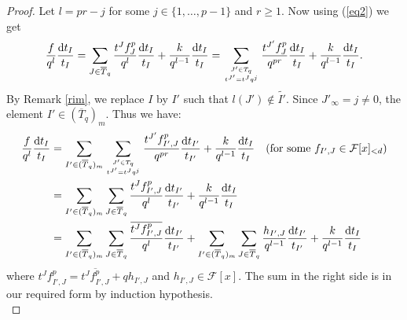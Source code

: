 \documentclass[times,10pt]{amsart}
\newcommand{\dd}{{\rm d}}
\newcommand{\F}{\ensuremath{\mathcal{F}}}
\begin{document}
\begin{proof}
  Let $ l= pr-j$ for some $j\in \{1,\ldots,p-1\}$ and $r\geq 1$.  Now using (\ref{eq2}) we get \begin{align*}
     \frac{f}{q^l}\frac{\dd t_I}{t_I} = \sum_{J\in \overline{T}_q} \frac{t^J f^p_J}{q^l}\frac{\dd t_I}{t_I}+ \frac{k}{q^{l-1}}\frac{\dd t_I}{t_I}= \sum_{J'\in {T}_q\atop t^{J'}=t^Jq^j} \frac{t^{J'} f^p_J}{q^{pr}}\frac{\dd t_I}{t_I}+ \frac{k}{q^{l-1}}\frac{\dd t_I}{t_I}.
 \end{align*}  By Remark \ref{rim},  we  replace $I$ by $I'$ such that $l(J')\notin \tilde{I'}$. Since $J'_{\infty}=j\neq 0$, the element  $I'\in (\overline{T}_q)_m$.  Thus we have:  \begin{align*}
      \frac{f}{q^l}\frac{\dd t_I}{t_I}&= \sum_{I'\in (\overline{T}_q)_m}\sum_{J'\in T_q\atop t^{J'}=t^Jq^j} \frac{ t^{J'} f^p_{I',J}}{q^{pr}}\frac{\dd t_{I'}}{t_{I'}}+ \frac{k}{q^{l-1}}\frac{\dd t_I}{t_I}\quad \text{(for some $ f_{I',J}\in \F[x]_{<d}$)}\\&=  \sum_{I'\in (\overline{T}_q)_m}\sum_{J\in \overline{T}_q} \frac{ t^{J} f^p_{I',J}}{q^l}\frac{\dd t_{I'}}{t_{I'}}+ \frac{k}{q^{l-1}}\frac{\dd t_I}{t_I}\\&= \sum_{I'\in (\overline{T}_q)_m}\sum_{J\in \overline{T}_q} \frac{ \overline{t^{J} f^p_{I',J}}}{q^{l}}\frac{\dd t_{I'}}{t_{I'}}+   \sum_{I'\in (\overline{T}_q)_m}\sum_{J\in \overline{T}_q} \frac{  h_{I',J}}{q^{l-1}}\frac{\dd t_{I'}}{t_{I'}}+ \frac{k}{q^{l-1}}\frac{\dd t_I}{t_I}
 \end{align*}where    $ t^J f^p_{I',J}=\overline{t^Jf^p_{I',J}}+qh_{I',J}$ and $ h_{I',J}\in \F[x]$.  The sum in the  right side is in our required form by induction hypothesis.\\


\end{proof}
\end{document}
